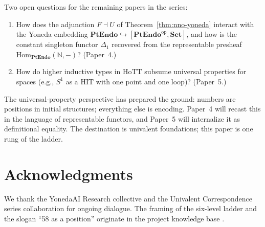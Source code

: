 \documentclass[12pt]{article}
\theoremstyle{definition}
\theoremstyle{remark}
\newcommand{\N}{\mathbb{N}}
\newcommand{\Set}{\mathbf{Set}}
\newcommand{\op}{^{\mathrm{op}}}
\newcommand{\Hom}{\mathrm{Hom}}
\newcommand{\PtEndo}{\mathbf{PtEndo}}
\begin{document}
Two open questions for the remaining papers in the series:
\begin{enumerate}
  \item How does the adjunction $F \dashv U$ of Theorem~\ref{thm:nno-yoneda} interact with the Yoneda embedding $\PtEndo \hookrightarrow [\PtEndo\op, \Set]$, and how is the constant singleton functor $\Delta_1$ recovered from the representable presheaf $\Hom_{\PtEndo}(\N, -)$? (Paper~4.)
  \item How do higher inductive types in HoTT subsume universal properties for spaces (e.g., $S^1$ as a HIT with one point and one loop)? (Paper~5.)
\end{enumerate}

The universal-property perspective has prepared the ground: numbers are positions in initial structures; everything else is encoding. Paper~4 will recast this in the language of representable functors, and Paper~5 will internalize it as definitional equality. The destination is univalent foundations; this paper is one rung of the ladder.

\section*{Acknowledgments}

We thank the YonedaAI Research collective and the Univalent Correspondence series collaboration for ongoing dialogue. The framing of the six-level ladder and the slogan ``58 as a position'' originate in the project knowledge base \cite{KnowledgeBase2026}.
\end{document}
